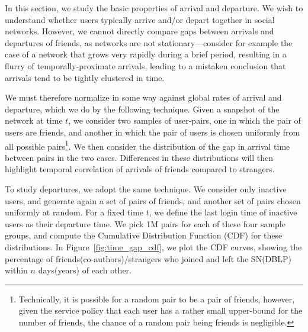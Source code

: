 \documentclass[phd,tocprelim]{cornell}
\begin{document}
In this section, we study the basic properties of arrival and
departure.  We wish to understand whether users typically arrive
and/or depart together in social networks.  However, we cannot
directly compare gaps between arrivals and departures of friends, as
networks are not stationary---consider for example the case of a
network that grows very rapidly during a brief period, resulting in a
flurry of temporally-proximate arrivals, leading to a mistaken
conclusion that arrivals tend to be tightly clustered in time.

We must therefore normalize in some way against global rates of
arrival and departure, which we do by the following technique. Given a snapshot of the network at time $t$, we
consider two samples of user-pairs, one in which the pair of users are
friends, and another in which the pair of users is chosen uniformly
from all possible pairs\footnote{Technically, it is possible for a random pair to be a pair of friends, however,
given the service policy that each user has a rather small upper-bound for the number of friends, the chance of a random pair being friends is negligible.}.  We then consider the distribution of the gap in arrival time between pairs in the two cases.  Differences in these
distributions will then highlight temporal correlation of arrivals of
friends compared to strangers.

To study departures, we adopt the same technique.  We consider only
inactive users, and generate again a set of
pairs of friends, and another set of pairs chosen uniformly at random.
For a fixed time $t$, we define the last login time of inactive users as their departure time. We pick 1M pairs for each of these four sample groups, and compute the
Cumulative Distribution Function (CDF) for these distributions. In Figure~\ref{fig:time_gap_cdf}, we plot the CDF curves, showing the percentage of friends(co-authors)/strangers who joined and left the SN(DBLP) within $n$ days(years) of each other.
\end{document}
